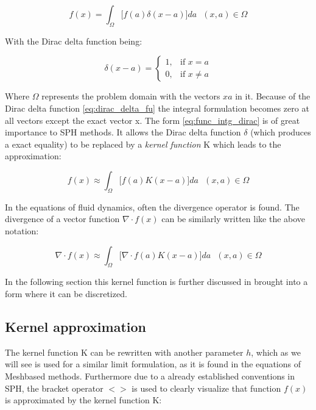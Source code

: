 \begin{equation} \label{eq:func_intg_dirac}
f(x) = \int_{\Omega} \biggl [ f(a) \delta(x-a) \biggr ] d a \ \ \ (x, a) \in \Omega
\end{equation}

With the Dirac delta function being:

\begin{equation}
\label{eq:dirac_delta_fu}
\delta(x-a)= 
\begin{cases} 
1, & \mbox{if } x = a \\ 
0, & \mbox{if } x \neq a
\end{cases}
\end{equation}


Where $ \Omega $ represents the problem domain with the vectors $ x  a $ in it. Because of the Dirac delta function \ref{eq:dirac_delta_fu} the integral formulation becomes zero at all vectors except the exact vector x. The form \ref{eq:func_intg_dirac} is of great importance to SPH methods. It allows the Dirac delta function $\delta$ (which produces a exact equality)  to be replaced by a \emph{kernel function} K which leads to the approximation:

\begin{equation} \label{eq:func_intg_kernel}
f(x) \approx \int_{\Omega} \biggl [ f(a) K(x-a) \biggr ] d a \ \ \ (x, a) \in \Omega
\end{equation}

In the equations of fluid dynamics, often the divergence operator is found. The divergence of a vector function $\nabla \cdot f(x)$ can be similarly
written like the above notation:

\begin{equation} \label{eq:func_intg_kernel_div}
\nabla \cdot f(x) \approx \int_{\Omega} \biggl [ \nabla \cdot f(a) K(x-a) \biggr ] d a \ \ \ (x, a) \in \Omega
\end{equation}
 

In the following section this kernel function is further discussed in brought into a form where it can be discretized.

\subsection{Kernel approximation}
The kernel function K can be rewritten with another parameter $h$, which as we will see is used for a similar limit formulation, as it is found in the equations of Meshbased methods. Furthermore due to a already established conventions in SPH, the bracket operator $ < >$ is used to 
clearly visualize that function $f(x)$ is approximated by the kernel function K:

